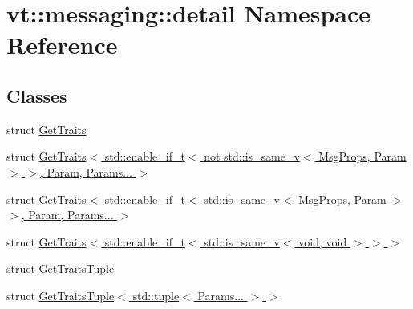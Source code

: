 \hypertarget{namespacevt_1_1messaging_1_1detail}{}\section{vt\+:\+:messaging\+:\+:detail Namespace Reference}
\label{namespacevt_1_1messaging_1_1detail}
\subsection*{Classes}
\begin{DoxyCompactItemize}
\item 
struct \hyperlink{structvt_1_1messaging_1_1detail_1_1_get_traits}{Get\+Traits}
\item 
struct \hyperlink{structvt_1_1messaging_1_1detail_1_1_get_traits_3_01std_1_1enable__if__t_3_01not_01std_1_1is__sam2b64ee26a7e98c8a0d5e4010ea831954}{Get\+Traits$<$ std\+::enable\+\_\+if\+\_\+t$<$ not std\+::is\+\_\+same\+\_\+v$<$ Msg\+Props, Param $>$ $>$, Param, Params... $>$}
\item 
struct \hyperlink{structvt_1_1messaging_1_1detail_1_1_get_traits_3_01std_1_1enable__if__t_3_01std_1_1is__same__v_3bc2a71b1e6b5e202c9f9124c04edb776}{Get\+Traits$<$ std\+::enable\+\_\+if\+\_\+t$<$ std\+::is\+\_\+same\+\_\+v$<$ Msg\+Props, Param $>$ $>$, Param, Params... $>$}
\item 
struct \hyperlink{structvt_1_1messaging_1_1detail_1_1_get_traits_3_01std_1_1enable__if__t_3_01std_1_1is__same__v_30a82890bb83a57326e36b60d2dd46a55}{Get\+Traits$<$ std\+::enable\+\_\+if\+\_\+t$<$ std\+::is\+\_\+same\+\_\+v$<$ void, void $>$ $>$ $>$}
\item 
struct \hyperlink{structvt_1_1messaging_1_1detail_1_1_get_traits_tuple}{Get\+Traits\+Tuple}
\item 
struct \hyperlink{structvt_1_1messaging_1_1detail_1_1_get_traits_tuple_3_01std_1_1tuple_3_01_params_8_8_8_01_4_01_4}{Get\+Traits\+Tuple$<$ std\+::tuple$<$ Params... $>$ $>$}
\end{DoxyCompactItemize}
